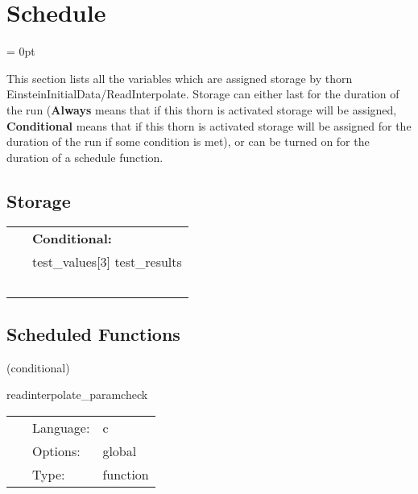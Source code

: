 
\section{Schedule} 


\parskip = 0pt


\noindent This section lists all the variables which are assigned storage by thorn EinsteinInitialData/ReadInterpolate.  Storage can either last for the duration of the run ({\bf Always} means that if this thorn is activated storage will be assigned, {\bf Conditional} means that if this thorn is activated storage will be assigned for the duration of the run if some condition is met), or can be turned on for the duration of a schedule function.


\subsection*{Storage}

\hspace{5mm}

 \begin{tabular*}{160mm}{ll} 
~& {\bf Conditional:} \\ 
~ &  test\_values[3] test\_results\\ 
~ & ~\\ 
\end{tabular*} 


\subsection*{Scheduled Functions}
\vspace{5mm}

   (conditional) 

\hspace{5mm} readinterpolate\_paramcheck 

\hspace{5mm}{\it sanity check given parameters } 


\hspace{5mm}

 \begin{tabular*}{160mm}{cll} 
~ & Language:  & c \\ 
~ & Options:  & global \\ 
~ & Type:  & function \\ 
\end{tabular*} 


\vspace{5mm}

